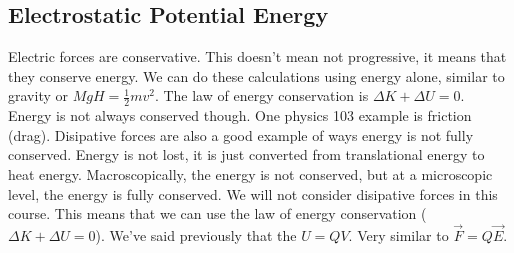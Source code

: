   \subsection{Electrostatic Potential Energy}
   Electric forces are conservative. This doesn't mean not progressive, it means that they conserve energy. We can do these calculations using energy alone, similar to gravity or $MgH=\frac{1}{2}mv^2$. The law of energy conservation is $\Delta K+\Delta U=0$. Energy is not always conserved though. One physics 103 example is friction (drag). Disipative forces are also a good example of ways energy is not fully conserved. Energy is not lost, it is just converted from translational energy to heat energy. Macroscopically, the energy is not conserved, but at a microscopic level, the energy is fully conserved. We will not consider disipative forces in this course. This means that we can use the law of energy conservation ($\Delta K+\Delta U=0$). We've said previously that the $U=QV$. Very similar to $\vec{F}=Q\vec{E}$.

